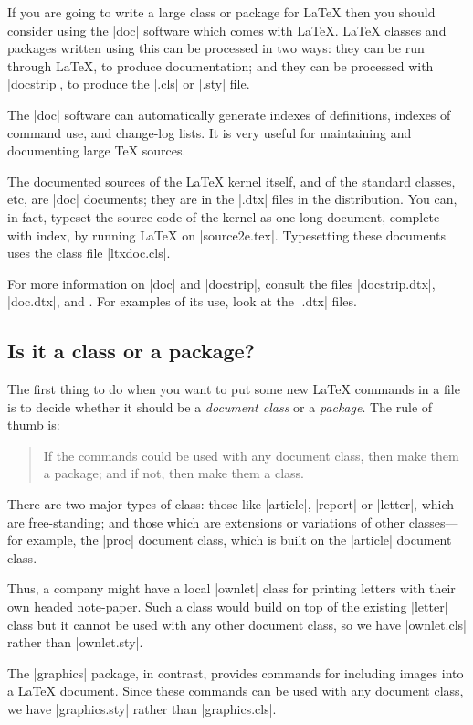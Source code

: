 \documentclass{ltxguide}[1995/11/28]
\begin{document}
If you are going to write a large class or package for \LaTeX{} then
you should consider using the |doc| software which comes with
\LaTeX{}.
\LaTeX{} classes and packages written using this can be
processed in two ways: they can be run through \LaTeX{}, to produce
documentation; and they can be processed with |docstrip|, to produce
the |.cls| or |.sty| file.

The |doc| software can automatically generate indexes of definitions,
indexes of command use, and change-log lists.  It is very useful for
maintaining and documenting large \TeX{} sources.

The documented sources of the \LaTeX{} kernel itself, and of the
standard classes, etc, are |doc| documents; they are in the |.dtx|
files in the distribution.  You can, in fact, typeset the source code
of the kernel as one long document, complete with index, by running
\LaTeX{} on |source2e.tex|.  Typesetting these documents uses the
class file |ltxdoc.cls|.

For more information on |doc| and |docstrip|, consult the files
|docstrip.dtx|, |doc.dtx|, and \emph{\LaTeXcomp}.  For examples of its
use, look at the |.dtx| files.

\subsection{Is it a class or a package?}
\label{Sec:classorpkg}

The first thing to do when you want to put some new \LaTeX{} commands
in a file is to decide whether it should be a \emph{document class} or a
\emph{package}.  The rule of thumb is:
\begin{quote}
  If the commands could be used with any document class, then make
  them a package; and if not, then make them a class.
\end{quote}

There are two major types of class: those like |article|, |report| or
|letter|, which are free-standing; and those which are extensions or
variations of other classes---for example, the |proc| document class,
which is built on the |article| document class.

Thus, a company might have a local |ownlet| class for printing letters
with their own headed note-paper.  Such a class would build on top of
the existing |letter| class but it cannot be used with any other
document class, so we have |ownlet.cls| rather than |ownlet.sty|.

The |graphics| package, in contrast, provides commands for including
images into a \LaTeX{} document.  Since these commands can be used
with any document class, we have |graphics.sty| rather than
|graphics.cls|.
\end{document}
